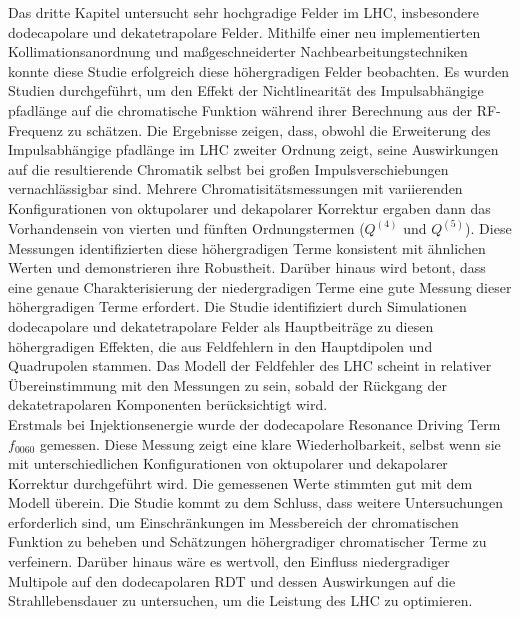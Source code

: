{%
Das dritte Kapitel untersucht sehr hochgradige Felder im LHC, insbesondere dodecapolare und
dekatetrapolare Felder. Mithilfe einer neu implementierten Kollimationsanordnung und
maßgeschneiderter Nachbearbeitungstechniken konnte diese Studie erfolgreich diese höhergradigen
Felder beobachten. Es wurden Studien durchgeführt, um den Effekt der Nichtlinearität des
Impulsabhängige pfadlänge auf die chromatische Funktion während ihrer Berechnung aus der RF-Frequenz
zu schätzen. Die Ergebnisse zeigen, dass, obwohl die Erweiterung des Impulsabhängige pfadlänge im
LHC zweiter Ordnung zeigt, seine Auswirkungen auf die resultierende Chromatik selbst bei großen
Impulsverschiebungen vernachlässigbar sind. Mehrere Chromatisitätsmessungen mit variierenden
Konfigurationen von oktupolarer und dekapolarer Korrektur ergaben dann das Vorhandensein von vierten
und fünften Ordnungstermen ($Q^{(4)}$ und $Q^{(5)}$). Diese Messungen identifizierten diese
höhergradigen Terme konsistent mit ähnlichen Werten und demonstrieren ihre Robustheit. Darüber
hinaus wird betont, dass eine genaue Charakterisierung der niedergradigen Terme eine gute Messung
dieser höhergradigen Terme erfordert. Die Studie identifiziert durch Simulationen dodecapolare und
dekatetrapolare Felder als Hauptbeiträge zu diesen höhergradigen Effekten, die aus Feldfehlern in
den Hauptdipolen und Quadrupolen stammen. Das Modell der Feldfehler des LHC scheint in relativer
Übereinstimmung mit den Messungen zu sein, sobald der Rückgang der dekatetrapolaren Komponenten
berücksichtigt wird.
\\
\indent Erstmals bei Injektionsenergie wurde der dodecapolare Resonance Driving Term $f_{0060}$
gemessen. Diese Messung zeigt eine klare Wiederholbarkeit, selbst wenn sie mit unterschiedlichen
Konfigurationen von oktupolarer und dekapolarer Korrektur durchgeführt wird. Die gemessenen Werte
stimmten gut mit dem Modell überein. Die Studie kommt zu dem Schluss, dass weitere Untersuchungen
erforderlich sind, um Einschränkungen im Messbereich der chromatischen Funktion zu beheben und
Schätzungen höhergradiger chromatischer Terme zu verfeinern. Darüber hinaus wäre es wertvoll, den
Einfluss niedergradiger Multipole auf den dodecapolaren RDT und dessen Auswirkungen auf die
Strahllebensdauer zu untersuchen, um die Leistung des LHC zu optimieren.

}
